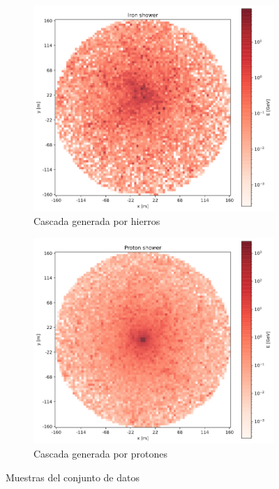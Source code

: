 \begin{figure}[h]
     \centering
     \begin{subfigure}[b]{0.45\textwidth}
         \centering
         \includegraphics[width=\textwidth]{imagenes/01_Introduccion/iron.png}
         \caption{Cascada generada por hierros}
         \label{fig:y equals x}
     \end{subfigure}
     \hfill
     \begin{subfigure}[b]{0.45\textwidth}
         \centering
         \includegraphics[width=\textwidth]{imagenes/01_Introduccion/proton.png}
         \caption{Cascada generada por protones}
         \label{fig:three sin x}
     \end{subfigure}
        \caption{Muestras del conjunto de datos}
        \label{fig:three graphs}
\end{figure}
